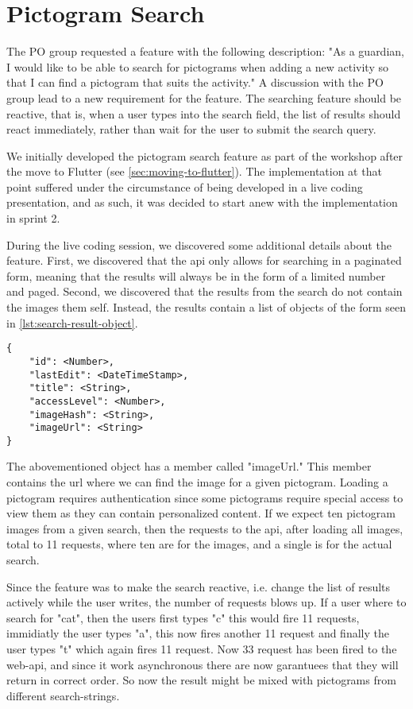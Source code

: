 \section{Pictogram Search}
The \gls{PO} group requested a feature with the following description: "As a guardian, I would like to be able to search for pictograms when adding a new activity so that I can find a pictogram that suits the activity." A discussion with the \gls{PO} group lead to a new requirement for the feature. The searching feature should be reactive, that is, when a user types into the search field, the list of results should react immediately, rather than wait for the user to submit the search query.

We initially developed the pictogram search feature as part of the workshop after the move to Flutter (see \autoref{sec:moving-to-flutter}). The implementation at that point suffered under the circumstance of being developed in a live coding presentation, and as such, it was decided to start anew with the implementation in sprint 2.

During the live coding session, we discovered some additional details about the feature. First, we discovered that the \gls{api} only allows for searching in a paginated form, meaning that the results will always be in the form of a limited number and paged. Second, we discovered that the results from the search do not contain the images them self. Instead, the results contain a list of objects of the form seen in \autoref{lst:search-result-object}.

\begin{lstlisting}[label={lst:search-result-object},caption={Search result object}]
{
    "id": <Number>,
    "lastEdit": <DateTimeStamp>,
    "title": <String>,
    "accessLevel": <Number>,
    "imageHash": <String>,
    "imageUrl": <String>
}
\end{lstlisting}

The abovementioned object has a member called "imageUrl." This member contains the \gls{url} where we can find the image for a given pictogram. Loading a pictogram requires authentication since some pictograms require special access to view them as they can contain personalized content. If we expect ten pictogram images from a given search, then the requests to the \gls{api}, after loading all images, total to 11 requests, where ten are for the images, and a single is for the actual search.

Since the feature was to make the search reactive, i.e. change the list of results actively while the user writes, the number of requests blows up. If a user where to search for "cat", then the users first types "c" this would fire 11 requests, immidiatly the user types "a", this now fires another 11 request and finally the user types "t" which again fires 11 request. Now 33 request has been fired to the web-api, and since it work asynchronous there are now garantuees that they will return in correct order. So now the result might be mixed with pictograms from different search-strings.

